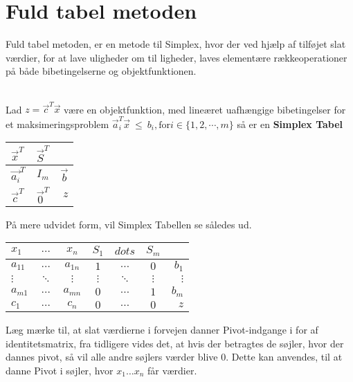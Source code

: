 \section{Fuld tabel metoden}
Fuld tabel metoden, er en metode til Simplex, hvor der ved hjælp af tilføjet slat værdier, for at lave uligheder om til ligheder, laves elementære rækkeoperationer på både bibetingelserne og objektfunktionen.\\
\\
\begin{defn}
Lad $z=\vec{c}^T\vec{x}$ være en objektfunktion, med lineæret uafhængige bibetingelser for et maksimeringsproblem $	\vec{a}_i^T\vec{x} \ \leq \  b_i, \text{for} i \in \{1,2,\cdots, m\}$ så er en \textbf{Simplex Tabel}\\
\begin{center}
\begin{tabular}{| l | c | r |}
  \hline
  $\vec{x}^T$&$\vec{S}^T$& \\ \hline			
  $\vec{a_i}^T$ & $I_m$ & $\vec{b}$ \\ \hline
  $\vec{c}^T$ & $\vec{0}^T$ & $z$ \\
  \hline  
\end{tabular}
\end{center}
\end{defn}
På mere udvidet form, vil Simplex Tabellen se således ud.
\begin{center}
\begin{tabular}{| l  c  c | c  c  c |r |}
  \hline	
  $x_1$&$\dots$&$x_n$&$S_1$&$dots$&$S_m$&\\ \hline		
  $a_{1 1}$ & $\dots$ & $a_{1 n}$ & $1$ & $\dots$ & $0$ & $b_1$\\
  $\vdots$ & $\ddots$ & $\vdots$ & $\vdots$ & $\ddots$ & $\vdots$ & $\vdots$\\
  $a_{m 1}$ & $\dots$ & $a_{m n}$ & $0$ & $\dots$ & $1$ & $b_m$\\ \hline
  $c_1$ & $\dots$ & $c_n$ & $0$ & $\dots$ & $0$ & $z$ \\ \hline  
\end{tabular}
\end{center}
Læg mærke til, at slat værdierne i forvejen danner Pivot-indgange i for af identitetsmatrix, fra tidligere vides det, at hvis der betragtes de søjler, hvor der dannes pivot, så vil alle andre søjlers værder blive $0$. Dette kan anvendes, til at danne Pivot i søjler, hvor $x_1\dots x_n$ får værdier.\\

